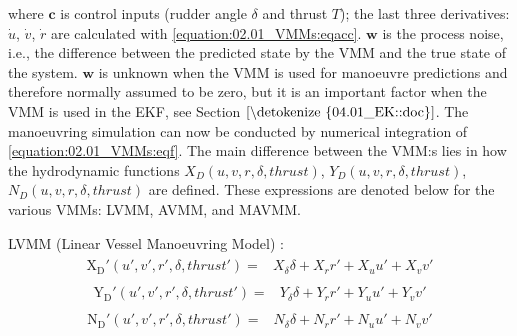 \documentclass[review]{elsarticle}
\begin{document}
where \(\mathbf{c}\) is control inputs (rudder angle \(\delta\) and thrust \(T\)); the last three derivatives: \(\dot{u}\), \(\dot{v}\), \(\dot{r}\) are calculated with \autoref{equation:02.01_VMMs:eqacc}.
\(\mathbf{w}\) is the process noise, i.e., the difference between the predicted state by the VMM and the true
state of the system. \(\mathbf{w}\) is unknown when the VMM is used for manoeuvre predictions and therefore normally
assumed to be zero, but it is an important factor when the VMM is used in the EKF, see Section \(\ref{\detokenize{04.01_EK::doc}}\).
The manoeuvring simulation can now be conducted by numerical integration of \autoref{equation:02.01_VMMs:eqf}. The main difference between the VMM:s lies in how the hydrodynamic functions \(X_D(u,v,r,\delta,thrust)\), \(Y_D(u,v,r,\delta,thrust)\), \(N_D(u,v,r,\delta,thrust)\) are defined. These expressions are denoted below for the various VMMs: LVMM, AVMM, and MAVMM.

 
LVMM (Linear Vessel Manoeuvring Model) \cite{matusiak_dynamics_2017}:
\begin{equation}\label{equation:02.01_VMMs:eqxlinear}
\begin{split}\begin{split}
\operatorname{X_{D}'}{\left(u',v',r',\delta,thrust' \right)} = & X_{\delta} \delta + X_{r} r' + X_{u} u' + X_{v} v' 
\end{split}\end{split}
\end{equation}\begin{equation}\label{equation:02.01_VMMs:eqylinear}
\begin{split}\begin{split}
\operatorname{Y_{D}'}{\left(u',v',r',\delta,thrust' \right)} = & Y_{\delta} \delta + Y_{r} r' + Y_{u} u' + Y_{v} v' 
\end{split}\end{split}
\end{equation}\begin{equation}\label{equation:02.01_VMMs:eqnlinear}
\begin{split}\begin{split}
\operatorname{N_{D}'}{\left(u',v',r',\delta,thrust' \right)} = & N_{\delta} \delta + N_{r} r' + N_{u} u' + N_{v} v' 
\end{split}\end{split}
\end{equation}
 
\end{document}

